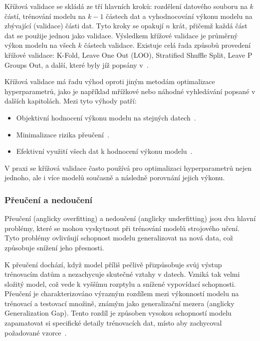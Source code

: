 Křížová validace se skládá ze tří hlavních kroků: rozdělení datového souboru na
$k$ částí, trénování modelu na $k - 1$ částech dat a vyhodnocování výkonu modelu
na zbývající (validace) části dat. Tyto kroky se opakují $n$ krát, přičemž každá
část dat se použije jednou jako validace. Výsledkem křížové validace je průměrný
výkon modelu na všech $k$ částech validace. Existuje celá řada způsobů provedení
křížové validace: K-Fold, Leave One Out (LOO), Stratified Shuffle Split, Leave P
Groups Out, a další, které byly jíž popsány v~\cite{Aurelien2022}.

Křížová validace má řadu výhod oproti jiným metodám optimalizace hyperparametrů,
jako je například mřížkové nebo náhodné vyhledávání popsané v dalších
kapitolách. Mezi tyto výhody patří:
\begin{itemize}
    \item Objektivní hodnocení výkonu modelu na stejných datech~\cite{tibshirani1993}.
    \item Minimalizace rizika přeučení~\cite{anguita2013}.
    \item Efektivní využití všech dat k hodnocení výkonu modelu~\cite{kohavi1995}.
\end{itemize}

V praxi se křížová validace často používá pro optimalizaci hyperparametrů nejen
jednoho, ale i více modelů současně a následně porovnání jejich výkonu.

\subsubsection{Přeučení a nedoučení}
\label{subsubsec:underoverfitting}
Přeučení (anglicky overfitting) a nedoučení (anglicky underfitting) jsou dva
hlavní problémy, které se mohou vyskytnout při trénování modelů strojového
učení. Tyto problémy ovlivňují schopnost modelu generalizovat na nová data, což
způsobuje snížení jeho přesnosti.

K přeučení dochází, když model příliš pečlivě přizpůsobuje svůj výstup
trénovacím datům a nezachycuje skutečné vztahy v datech. Vzniká tak velmi
složitý model, což vede k vyššímu rozptylu a snížené vypovídací schopnosti.
Přeučení je charakterizováno výrazným rozdílem mezi výkonností modelu na
trénovací a testovací množině, známým jako generalizační mezera (anglicky
Generalization Gap). Tento rozdíl je způsoben vysokou schopností modelu
zapamatovat si specifické detaily trénovacích dat, místo aby zachycoval
požadované vzorce~\cite{Ghojogh2019}.

